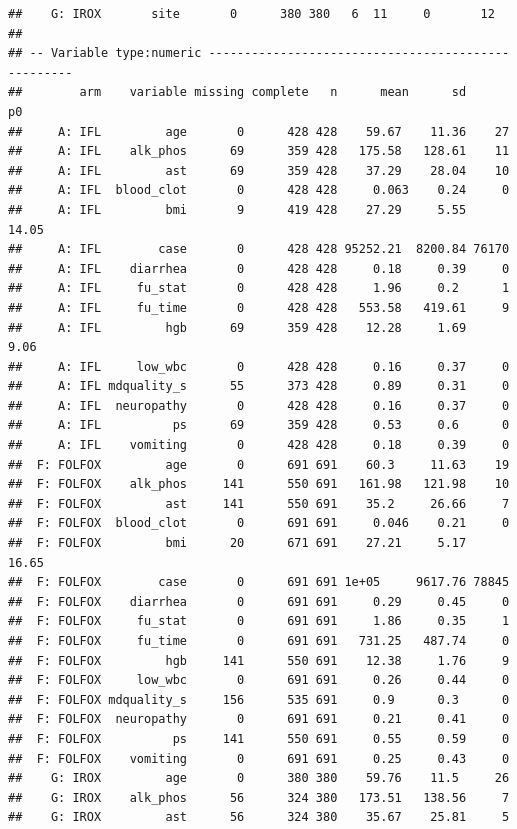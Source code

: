 \documentclass[fleqn,10pt,lineno]{wlpeerj} %
\begin{document}
\begin{verbatim}
##    G: IROX       site       0      380 380   6  11     0       12
## 
## -- Variable type:numeric ---------------------------------------------------
##        arm    variable missing complete   n      mean      sd       p0
##     A: IFL         age       0      428 428    59.67    11.36    27   
##     A: IFL    alk_phos      69      359 428   175.58   128.61    11   
##     A: IFL         ast      69      359 428    37.29    28.04    10   
##     A: IFL  blood_clot       0      428 428     0.063    0.24     0   
##     A: IFL         bmi       9      419 428    27.29     5.55    14.05
##     A: IFL        case       0      428 428 95252.21  8200.84 76170   
##     A: IFL    diarrhea       0      428 428     0.18     0.39     0   
##     A: IFL     fu_stat       0      428 428     1.96     0.2      1   
##     A: IFL     fu_time       0      428 428   553.58   419.61     9   
##     A: IFL         hgb      69      359 428    12.28     1.69     9.06
##     A: IFL     low_wbc       0      428 428     0.16     0.37     0   
##     A: IFL mdquality_s      55      373 428     0.89     0.31     0   
##     A: IFL  neuropathy       0      428 428     0.16     0.37     0   
##     A: IFL          ps      69      359 428     0.53     0.6      0   
##     A: IFL    vomiting       0      428 428     0.18     0.39     0   
##  F: FOLFOX         age       0      691 691    60.3     11.63    19   
##  F: FOLFOX    alk_phos     141      550 691   161.98   121.98    10   
##  F: FOLFOX         ast     141      550 691    35.2     26.66     7   
##  F: FOLFOX  blood_clot       0      691 691     0.046    0.21     0   
##  F: FOLFOX         bmi      20      671 691    27.21     5.17    16.65
##  F: FOLFOX        case       0      691 691 1e+05     9617.76 78845   
##  F: FOLFOX    diarrhea       0      691 691     0.29     0.45     0   
##  F: FOLFOX     fu_stat       0      691 691     1.86     0.35     1   
##  F: FOLFOX     fu_time       0      691 691   731.25   487.74     0   
##  F: FOLFOX         hgb     141      550 691    12.38     1.76     9   
##  F: FOLFOX     low_wbc       0      691 691     0.26     0.44     0   
##  F: FOLFOX mdquality_s     156      535 691     0.9      0.3      0   
##  F: FOLFOX  neuropathy       0      691 691     0.21     0.41     0   
##  F: FOLFOX          ps     141      550 691     0.55     0.59     0   
##  F: FOLFOX    vomiting       0      691 691     0.25     0.43     0   
##    G: IROX         age       0      380 380    59.76    11.5     26   
##    G: IROX    alk_phos      56      324 380   173.51   138.56     7   
##    G: IROX         ast      56      324 380    35.67    25.81     5   

\end{verbatim}
\end{document}
